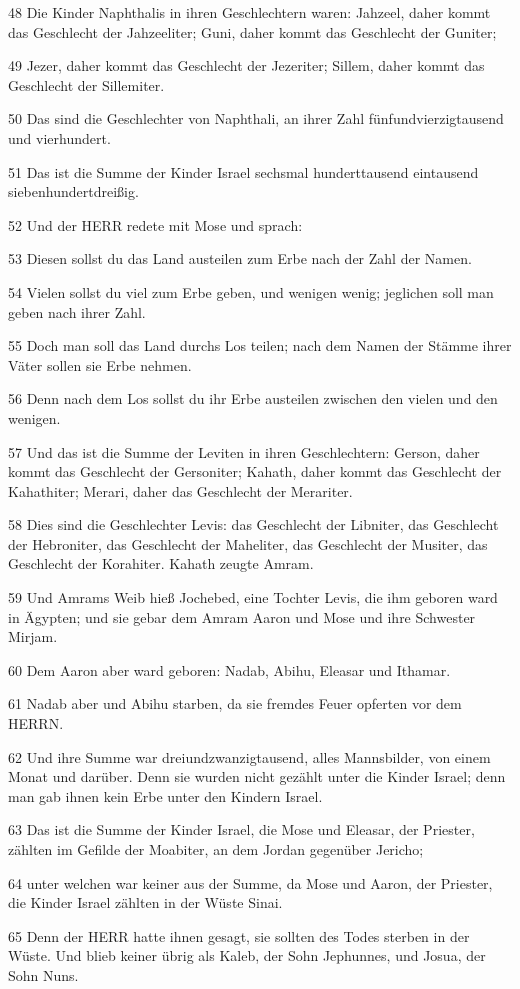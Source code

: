 \par 48 Die Kinder Naphthalis in ihren Geschlechtern waren: Jahzeel, daher kommt das Geschlecht der Jahzeeliter; Guni, daher kommt das Geschlecht der Guniter;
\par 49 Jezer, daher kommt das Geschlecht der Jezeriter; Sillem, daher kommt das Geschlecht der Sillemiter.
\par 50 Das sind die Geschlechter von Naphthali, an ihrer Zahl fünfundvierzigtausend und vierhundert.
\par 51 Das ist die Summe der Kinder Israel sechsmal hunderttausend eintausend siebenhundertdreißig.
\par 52 Und der HERR redete mit Mose und sprach:
\par 53 Diesen sollst du das Land austeilen zum Erbe nach der Zahl der Namen.
\par 54 Vielen sollst du viel zum Erbe geben, und wenigen wenig; jeglichen soll man geben nach ihrer Zahl.
\par 55 Doch man soll das Land durchs Los teilen; nach dem Namen der Stämme ihrer Väter sollen sie Erbe nehmen.
\par 56 Denn nach dem Los sollst du ihr Erbe austeilen zwischen den vielen und den wenigen.
\par 57 Und das ist die Summe der Leviten in ihren Geschlechtern: Gerson, daher kommt das Geschlecht der Gersoniter; Kahath, daher kommt das Geschlecht der Kahathiter; Merari, daher das Geschlecht der Merariter.
\par 58 Dies sind die Geschlechter Levis: das Geschlecht der Libniter, das Geschlecht der Hebroniter, das Geschlecht der Maheliter, das Geschlecht der Musiter, das Geschlecht der Korahiter. Kahath zeugte Amram.
\par 59 Und Amrams Weib hieß Jochebed, eine Tochter Levis, die ihm geboren ward in Ägypten; und sie gebar dem Amram Aaron und Mose und ihre Schwester Mirjam.
\par 60 Dem Aaron aber ward geboren: Nadab, Abihu, Eleasar und Ithamar.
\par 61 Nadab aber und Abihu starben, da sie fremdes Feuer opferten vor dem HERRN.
\par 62 Und ihre Summe war dreiundzwanzigtausend, alles Mannsbilder, von einem Monat und darüber. Denn sie wurden nicht gezählt unter die Kinder Israel; denn man gab ihnen kein Erbe unter den Kindern Israel.
\par 63 Das ist die Summe der Kinder Israel, die Mose und Eleasar, der Priester, zählten im Gefilde der Moabiter, an dem Jordan gegenüber Jericho;
\par 64 unter welchen war keiner aus der Summe, da Mose und Aaron, der Priester, die Kinder Israel zählten in der Wüste Sinai.
\par 65 Denn der HERR hatte ihnen gesagt, sie sollten des Todes sterben in der Wüste. Und blieb keiner übrig als Kaleb, der Sohn Jephunnes, und Josua, der Sohn Nuns.

